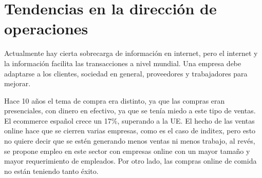 \documentclass[12pt]{report} %
\begin{document}
\hypertarget{tendencias-en-la-direcciuxf3n-de-operaciones}{%
\section{Tendencias en la dirección de
operaciones}\label{tendencias-en-la-direcciuxf3n-de-operaciones}}

Actualmente hay cierta sobrecarga de información en internet, pero el
internet y la información facilita las transacciones a nivel mundial.
Una empresa debe adaptarse a los clientes, sociedad en general,
proveedores y trabajadores para mejorar.

Hace 10 años el tema de compra era distinto, ya que las compras eran
presenciales, con dinero en efectivo, ya que se tenía miedo a este tipo
de ventas. El ecommerce español crece un 17\%, superando a la UE. El
hecho de las ventas online hace que se cierren varias empresas, como es
el caso de inditex, pero esto no quiere decir que se estén generando
menos ventas ni menos trabajo, al revés, se propone empleo en este
sector con empresas online con un mayor tamaño y mayor requerimiento de
empleados. Por otro lado, las compras online de comida no están teniendo
tanto éxito.
\end{document}
